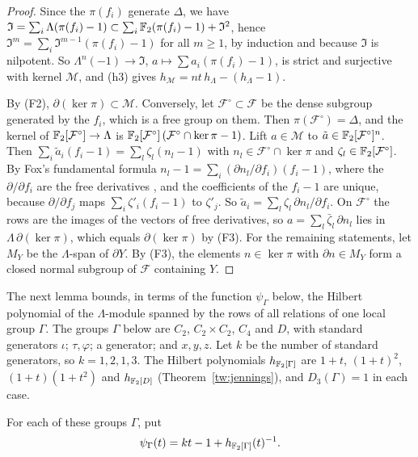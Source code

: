 \begin{proof}
Since the $\pi(f_i)$ generate $\Delta$, we have
$\mathfrak I=\sum_i\Lambda(\pi(f_i)-1)\subset\sum_i\mathbb F_2(\pi(f_i)-1)+\mathfrak I^2$,
hence $\mathfrak I^m=\sum_i\mathfrak I^{m-1}(\pi(f_i)-1)$ for all $m\ge1$, by
induction and because $\mathfrak I$ is nilpotent. So
$\Lambda^n(-1)\to\mathfrak I$, $a\mapsto\sum a_i(\pi(f_i)-1)$, is strict and
surjective with kernel $\mathcal M$, and (h3) gives
$h_{\mathcal M}=nt\,h_\Lambda-(h_\Lambda-1)$.

By (F2), $\partial(\ker\pi)\subset\mathcal M$. Conversely, let
$\mathcal F^\circ\subset\mathcal F$ be the dense subgroup generated by the
$f_i$, which is a free group on them. Then $\pi(\mathcal F^\circ)=\Delta$, and
the kernel of $\mathbb F_2[\mathcal F^\circ]\to\Lambda$ is
$\mathbb F_2[\mathcal F^\circ]\,(\mathcal F^\circ\cap\ker\pi-1)$. Lift
$a\in\mathcal M$ to $\tilde a\in\mathbb F_2[\mathcal F^\circ]^n$. Then
$\sum_i\tilde a_i(f_i-1)=\sum_l\zeta_l(n_l-1)$ with
$n_l\in\mathcal F^\circ\cap\ker\pi$ and $\zeta_l\in\mathbb F_2[\mathcal F^\circ]$.
By Fox's fundamental formula
$n_l-1=\sum_i(\partial n_l/\partial f_i)(f_i-1)$, where the
$\partial/\partial f_i$ are the free derivatives \cite[Section~2]{Fox1953},
and the coefficients of the $f_i-1$ are unique, because $\partial/\partial f_j$
maps $\sum_i\zeta'_i(f_i-1)$ to $\zeta'_j$. So
$\tilde a_i=\sum_l\zeta_l\,\partial n_l/\partial f_i$. On $\mathcal F^\circ$
the rows are the images of the vectors of free derivatives, so
$a=\sum_l\bar\zeta_l\,\partial n_l$ lies in $\Lambda\,\partial(\ker\pi)$, which
equals $\partial(\ker\pi)$ by (F3). For the remaining statements, let $M_Y$ be
the $\Lambda$-span of $\partial Y$. By (F3), the elements $n\in\ker\pi$ with
$\partial n\in M_Y$ form a closed normal subgroup of $\mathcal F$ containing
$Y$.
\end{proof}

The next lemma bounds, in terms of the function $\psi_\Gamma$ below, the
Hilbert polynomial of the $\Lambda$-module spanned by the rows of all
relations of one local group $\Gamma$. The groups
$\Gamma$ below are $C_2$, $C_2\times C_2$, $C_4$ and $D$, with standard
generators $\iota$; $\tau,\varphi$; a generator; and $x,y,z$. Let $k$ be the
number of standard generators, so $k=1,2,1,3$. The Hilbert polynomials
$h_{\mathbb F_2[\Gamma]}$ are $1+t$, $(1+t)^2$, $(1+t)(1+t^2)$ and $h_{\mathbb F_2[D]}$
(Theorem~\ref{tw:jennings}), and $D_3(\Gamma)=1$ in each case.

\begin{definition}\label{tw:psi}
For each of these groups $\Gamma$, put
\[
 \psi_\Gamma(t)=kt-1+h_{\mathbb F_2[\Gamma]}(t)^{-1}.
\]
\end{definition}

